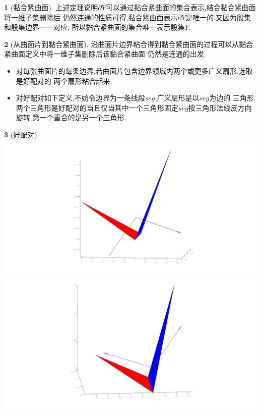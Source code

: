 \documentclass[UTF8]{ctexbeamer}	%
\theoremstyle{plain}
\theoremstyle{definition}
\newtheorem{emt}{}[section]
\theoremstyle{remark}
\numberwithin{equation}{section}
\begin{document}
\begin{frame}
    \begin{emt}[黏合紧曲面]
        上述定理说明$\partial Y$可以通过黏合紧曲面的集合表示,结合黏合紧曲面将一维子集删除后
        仍然连通的性质可得,黏合紧曲面表示$\partial Y$是唯一的.又因为殷集和殷集边界一一对应,
        所以黏合紧曲面的集合唯一表示殷集$Y$.
    \end{emt}

    \begin{emt}[从曲面片到黏合紧曲面]
        沿曲面片边界粘合得到黏合紧曲面的过程可以从黏合紧曲面定义中将一维子集删除后该黏合紧曲面
        仍然是连通的出发.

        \begin{itemize}
            \item 对每张曲面片的每条边界,若曲面片包含边界领域内两个或更多广义扇形.选取是好配对的
            两个扇形粘合起来.
            \item 对好配对如下定义,不妨令边界为一条线段$seg$,广义扇形是以$seg$为边的
            三角形.两个三角形是好配对的当且仅当其中一个三角形固定$seg$按三角形法线反方向旋转
            第一个重合的是另一个三角形.
        \end{itemize}
        
    \end{emt}
\end{frame}

\begin{frame}
    \begin{emt}[好配对]
            \centering
        \includegraphics[width = .6\textwidth]{fig/s3p2.jpg}
        \includegraphics[width = .6\textwidth]{fig/s3p3.jpg}
    \end{emt}
\end{frame}
\end{document}
